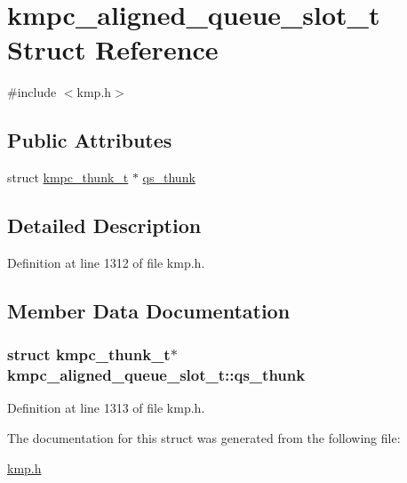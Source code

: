 \hypertarget{structkmpc__aligned__queue__slot__t}{\section{kmpc\-\_\-aligned\-\_\-queue\-\_\-slot\-\_\-t Struct Reference}
\label{structkmpc__aligned__queue__slot__t}
}


{\ttfamily \#include $<$kmp.\-h$>$}

\subsection*{Public Attributes}
\begin{DoxyCompactItemize}
\item 
struct \hyperlink{structkmpc__thunk__t}{kmpc\-\_\-thunk\-\_\-t} $\ast$ \hyperlink{structkmpc__aligned__queue__slot__t_ad07a0c151907d6c4c2e93912dfedb026}{qs\-\_\-thunk}
\end{DoxyCompactItemize}


\subsection{Detailed Description}


Definition at line 1312 of file kmp.\-h.



\subsection{Member Data Documentation}
\hypertarget{structkmpc__aligned__queue__slot__t_ad07a0c151907d6c4c2e93912dfedb026}{
\subsubsection[{qs\-\_\-thunk}]{\setlength{\rightskip}{0pt plus 5cm}struct {\bf kmpc\-\_\-thunk\-\_\-t}$\ast$ kmpc\-\_\-aligned\-\_\-queue\-\_\-slot\-\_\-t\-::qs\-\_\-thunk}}\label{structkmpc__aligned__queue__slot__t_ad07a0c151907d6c4c2e93912dfedb026}


Definition at line 1313 of file kmp.\-h.



The documentation for this struct was generated from the following file\-:\begin{DoxyCompactItemize}
\item 
\hyperlink{kmp_8h}{kmp.\-h}\end{DoxyCompactItemize}
